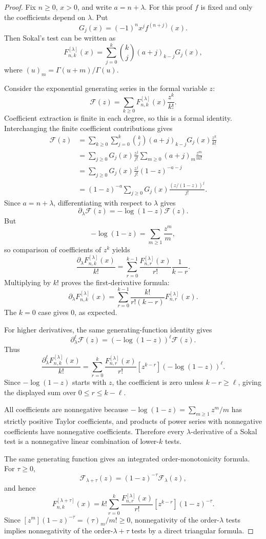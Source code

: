 \documentclass[11pt]{article}
\numberwithin{equation}{section}
\theoremstyle{definition}
\theoremstyle{remark}
\newcommand{\1}{\mathbf 1}
\begin{document}
\begin{proof}
Fix \(n\ge0\), \(x>0\), and write \(a=n+\lambda\). For this proof \(f\) is fixed and only the coefficients depend on \(\lambda\). Put
\[
G_j(x)=(-1)^n x^j f^{(n+j)}(x).
\]
Then Sokal's test can be written as
\[
F^{[\lambda]}_{n,k}(x)
=
\sum_{j=0}^k \binom{k}{j}(a+j)_{k-j}G_j(x),
\]
where \((u)_m=\Gamma(u+m)/\Gamma(u)\).

Consider the exponential generating series in the formal variable \(z\):
\[
\mathcal F(z)
=
\sum_{k\ge0}F^{[\lambda]}_{n,k}(x)\frac{z^k}{k!}.
\]
Coefficient extraction is finite in each degree, so this is a formal identity. Interchanging the finite coefficient contributions gives
\[
\begin{aligned}
\mathcal F(z)
&=\sum_{k\ge0}\sum_{j=0}^k
\binom{k}{j}(a+j)_{k-j}G_j(x)\frac{z^k}{k!}\\
&=\sum_{j\ge0}G_j(x)\frac{z^j}{j!}
\sum_{m\ge0}(a+j)_m\frac{z^m}{m!}\\
&=\sum_{j\ge0}G_j(x)\frac{z^j}{j!}(1-z)^{-a-j}\\
&=(1-z)^{-a}\sum_{j\ge0}G_j(x)
\frac{(z/(1-z))^j}{j!}.
\end{aligned}
\]
Since \(a=n+\lambda\), differentiating with respect to \(\lambda\) gives
\[
\partial_\lambda \mathcal F(z)
=
-\log(1-z)\mathcal F(z).
\]
But
\[
-\log(1-z)=\sum_{m\ge1}\frac{z^m}{m},
\]
so comparison of coefficients of \(z^k\) yields
\[
\frac{\partial_\lambda F^{[\lambda]}_{n,k}(x)}{k!}
=
\sum_{r=0}^{k-1}
\frac{F^{[\lambda]}_{n,r}(x)}{r!}\frac1{k-r}.
\]
Multiplying by \(k!\) proves the first-derivative formula:
\[
\partial_\lambda F^{[\lambda]}_{n,k}(x)
=
\sum_{r=0}^{k-1}\frac{k!}{r!(k-r)}
F^{[\lambda]}_{n,r}(x).
\]
The \(k=0\) case gives \(0\), as expected.

For higher derivatives, the same generating-function identity gives
\[
\partial_\lambda^\ell \mathcal F(z)
=
(-\log(1-z))^\ell \mathcal F(z).
\]
Thus
\[
\frac{\partial_\lambda^\ell F^{[\lambda]}_{n,k}(x)}{k!}
=
\sum_{r=0}^{k}
\frac{F^{[\lambda]}_{n,r}(x)}{r!}
[z^{k-r}](-\log(1-z))^\ell.
\]
Since \(-\log(1-z)\) starts with \(z\), the coefficient is zero unless \(k-r\ge\ell\), giving the displayed sum over \(0\le r\le k-\ell\).

All coefficients are nonnegative because \(-\log(1-z)=\sum_{m\ge1}z^m/m\) has strictly positive Taylor coefficients, and products of power series with nonnegative coefficients have nonnegative coefficients. Therefore every \(\lambda\)-derivative of a Sokal test is a nonnegative linear combination of lower-\(k\) tests.

The same generating function gives an integrated order-monotonicity formula. For \(\tau\ge0\),
\[
\mathcal F_{\lambda+\tau}(z)
=
(1-z)^{-\tau}\mathcal F_\lambda(z),
\]
and hence
\[
F^{[\lambda+\tau]}_{n,k}(x)
=
k!\sum_{r=0}^{k}
\frac{F^{[\lambda]}_{n,r}(x)}{r!}
[z^{k-r}](1-z)^{-\tau}.
\]
Since \([z^m](1-z)^{-\tau}=(\tau)_m/m!\ge0\), nonnegativity of the order-\(\lambda\) tests implies nonnegativity of the order-\(\lambda+\tau\) tests by a direct triangular formula.
\end{proof}
\end{document}
